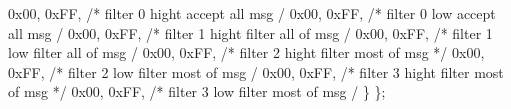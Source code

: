 \documentclass[a4paper,12pt]{book}
\begin{document}
{  \space \space \space \space \space 0x00, 0xFF, /* filter 0 hight accept all msg
\space \space \space \space \space */\newline
  \space \space \space \space \space 0x00, 0xFF, /* filter 0 low accept all msg
\space \space \space \space \space \space \space */\newline
  \space \space \space \space \space 0x00, 0xFF, /* filter 1 hight filter all of \space msg
\space */\newline
  \space \space \space \space \space 0x00, 0xFF, /* filter 1 low filter all of \space msg
\space \space \space */\newline
  \space \space \space \space \space 0x00, 0xFF, /* filter 2 hight filter most of \space msg
*/\newline
  \space \space \space \space \space 0x00, 0xFF, /* filter 2 low filter most of \space msg
\space \space */\newline
  \space \space \space \space \space 0x00, 0xFF, /* filter 3 hight filter most of \space msg
*/\newline
  \space \space \space \space \space 0x00, 0xFF, /* filter 3 low filter most of \space msg
\space \space */\newline
  \space \space \space \}\newline
  \space \};}
\end{document}

